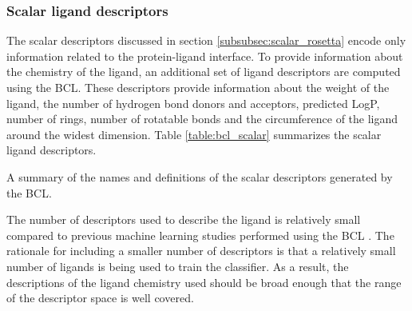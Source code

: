 \subsubsection{Scalar ligand descriptors}
\label{subsubsec:scalar_bcl}
The scalar descriptors discussed in section \ref{subsubsec:scalar_rosetta} encode only information related to the protein-ligand interface.
To provide information about the chemistry of the ligand, an additional set of ligand descriptors are computed using the \ac{BCL}.
These descriptors provide information about the weight of the ligand, the number of hydrogen bond donors and acceptors, predicted LogP, number of rings, number of rotatable bonds and the circumference of the ligand around the widest dimension.
Table \ref{table:bcl_scalar} summarizes the scalar ligand descriptors.
\begin{table}
\scriptsize
\renewcommand{\tabcolsep}{0.09cm}
\centering

\caption{A summary of the names and definitions of the scalar descriptors generated by the \acs{BCL}. }
\label{table:bcl_scalar}
\end{table}
The number of descriptors used to describe the ligand is relatively small compared to previous machine learning studies performed using the \ac{BCL} \citep{Mueller:2010dx}.
The rationale for including a smaller number of descriptors is that a relatively small number of ligands is being used to train the classifier.
As a result, the descriptions of the ligand chemistry used should be broad enough that the range of the descriptor space is well covered.

